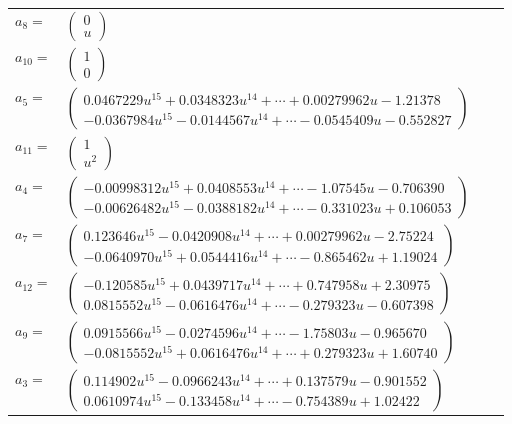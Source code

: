 \documentclass[1p]{elsarticle_modified}
\theoremstyle{definition}
\begin{document}
\begin{tabular}{m{7pt} m{180pt} m{7pt} m{180pt} }
\flushright $a_{8}=$&$\begin{pmatrix}0\\u\end{pmatrix}$ \\
\flushright $a_{10}=$&$\begin{pmatrix}1\\0\end{pmatrix}$ \\
\flushright $a_{5}=$&$\begin{pmatrix}0.0467229 u^{15}+0.0348323 u^{14}+\cdots+0.00279962 u-1.21378\\-0.0367984 u^{15}-0.0144567 u^{14}+\cdots-0.0545409 u-0.552827\end{pmatrix}$ \\
\flushright $a_{11}=$&$\begin{pmatrix}1\\u^2\end{pmatrix}$ \\
\flushright $a_{4}=$&$\begin{pmatrix}-0.00998312 u^{15}+0.0408553 u^{14}+\cdots-1.07545 u-0.706390\\-0.00626482 u^{15}-0.0388182 u^{14}+\cdots-0.331023 u+0.106053\end{pmatrix}$ \\
\flushright $a_{7}=$&$\begin{pmatrix}0.123646 u^{15}-0.0420908 u^{14}+\cdots+0.00279962 u-2.75224\\-0.0640970 u^{15}+0.0544416 u^{14}+\cdots-0.865462 u+1.19024\end{pmatrix}$ \\
\flushright $a_{12}=$&$\begin{pmatrix}-0.120585 u^{15}+0.0439717 u^{14}+\cdots+0.747958 u+2.30975\\0.0815552 u^{15}-0.0616476 u^{14}+\cdots-0.279323 u-0.607398\end{pmatrix}$ \\
\flushright $a_{9}=$&$\begin{pmatrix}0.0915566 u^{15}-0.0274596 u^{14}+\cdots-1.75803 u-0.965670\\-0.0815552 u^{15}+0.0616476 u^{14}+\cdots+0.279323 u+1.60740\end{pmatrix}$ \\
\flushright $a_{3}=$&$\begin{pmatrix}0.114902 u^{15}-0.0966243 u^{14}+\cdots+0.137579 u-0.901552\\0.0610974 u^{15}-0.133458 u^{14}+\cdots-0.754389 u+1.02422\end{pmatrix}$ \\

\end{tabular}
\end{document}
